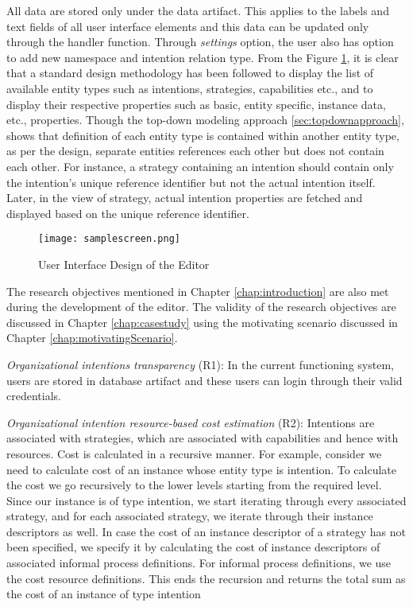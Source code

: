 All data are stored only under the data artifact. This applies to the labels and text fields of all user interface elements and this data can be updated only through the handler function. Through \textit{settings} option, the user also has option to add new namespace and intention relation type. From the Figure \ref{fig:samplescreen}, it is clear that a standard design methodology has been followed to display the list of available entity types such as intentions, strategies, capabilities etc., and to display their respective properties such as basic, entity specific, instance data, etc., properties. Though the top-down modeling approach \ref{sec:topdownapproach}, shows that definition of each entity type is contained within another entity type, as per the design, separate entities references each other but does not contain each other. For instance, a strategy containing an intention should contain only the intention's unique reference identifier but not the actual intention itself. Later, in the view of strategy, actual intention properties are fetched and displayed based on the unique reference identifier. 

\begin{figure}
	\centering
	\texttt{[image: samplescreen.png]}
	\caption{User Interface Design of the Editor}
	\label{fig:samplescreen}
\end{figure}

The research objectives mentioned in Chapter \ref{chap:introduction} are also met during the development of the editor. The validity of the research objectives are discussed in Chapter \ref{chap:casestudy} using the motivating scenario discussed in Chapter \ref{chap:motivatingScenario}.

\textit{Organizational intentions transparency} (R1): In the current functioning system, users are stored in database artifact and these users can login through their valid credentials. 

\textit{Organizational intention resource-based cost estimation} (R2): Intentions are associated with strategies, which are associated with capabilities and hence with resources. Cost is calculated in a recursive manner. For example, consider we need to calculate cost of an instance whose entity type is intention. To calculate the cost we go recursively to the lower levels starting from the required level. Since our instance is of type intention, we start iterating through every associated strategy, and for each associated strategy, we iterate through their instance descriptors as well. In case the cost of an instance descriptor of a strategy has not been specified, we specify it by calculating the cost of instance descriptors of associated informal process definitions. For informal process definitions, we use the cost resource definitions. This ends the recursion and returns the total sum as the cost of an instance of type intention

